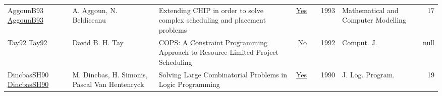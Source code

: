 {\begin{longtable}{p{3cm}p{6cm}p{7cm}rrrp{3cm}r}
AggounB93 \href{https://www.sciencedirect.com/science/article/pii/089571779390068A}{AggounB93} & A. Aggoun, N. Beldiceanu & Extending {CHIP} in order to solve complex scheduling and placement problems & \href{articles/AggounB93.pdf}{Yes} & \cite{AggounB93} & 1993 & Mathematical and Computer Modelling & 17\\
Tay92 \href{}{Tay92} & David B. H. Tay & {COPS:} {A} Constraint Programming Approach to Resource-Limited Project Scheduling & No & \cite{Tay92} & 1992 & Comput. J. & null\\
DincbasSH90 \href{https://doi.org/10.1016/0743-1066(90)90052-7}{DincbasSH90} & M. Dincbas, H. Simonis, Pascal Van Hentenryck & Solving Large Combinatorial Problems in Logic Programming & \href{articles/DincbasSH90.pdf}{Yes} & \cite{DincbasSH90} & 1990 & J. Log. Program. & 19\\
\end{longtable}
}

